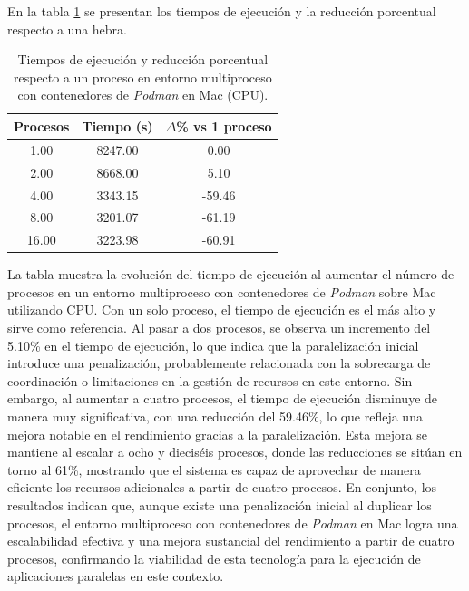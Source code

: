 En la tabla \ref{tab:multi-node_mac_podman} se presentan los tiempos de ejecución y la reducción porcentual respecto a una hebra.

\begin{table}[ht]
    \centering
    \begin{tabular}{|c|c|c|}
        \hline
        \textbf{Procesos} & \textbf{Tiempo (s)} & \textbf{$\Delta$\% vs 1 proceso} \\
        \hline
        1.00              & 8247.00             & 0.00                             \\
        2.00              & 8668.00             & 5.10                             \\
        4.00              & 3343.15             & -59.46                           \\
        8.00              & 3201.07             & -61.19                           \\
        16.00             & 3223.98             & -60.91                           \\
        \hline
    \end{tabular}
    \caption{Tiempos de ejecución y reducción porcentual respecto a un proceso en entorno multiproceso con contenedores de \textit{Podman} en Mac (CPU).}
    \label{tab:multi-node_mac_podman}
\end{table}

La tabla muestra la evolución del tiempo de ejecución al aumentar el número de procesos en un entorno multiproceso con contenedores de \textit{Podman} sobre Mac utilizando CPU. Con un solo proceso, el tiempo de ejecución es el más alto y sirve como referencia. Al pasar a dos procesos, se observa un incremento del 5.10\% en el tiempo de ejecución, lo que indica que la paralelización inicial introduce una penalización, probablemente relacionada con la sobrecarga de coordinación o limitaciones en la gestión de recursos en este entorno. Sin embargo, al aumentar a cuatro procesos, el tiempo de ejecución disminuye de manera muy significativa, con una reducción del 59.46\%, lo que refleja una mejora notable en el rendimiento gracias a la paralelización. Esta mejora se mantiene al escalar a ocho y dieciséis procesos, donde las reducciones se sitúan en torno al 61\%, mostrando que el sistema es capaz de aprovechar de manera eficiente los recursos adicionales a partir de cuatro procesos. En conjunto, los resultados indican que, aunque existe una penalización inicial al duplicar los procesos, el entorno multiproceso con contenedores de \textit{Podman} en Mac logra una escalabilidad efectiva y una mejora sustancial del rendimiento a partir de cuatro procesos, confirmando la viabilidad de esta tecnología para la ejecución de aplicaciones paralelas en este contexto.

